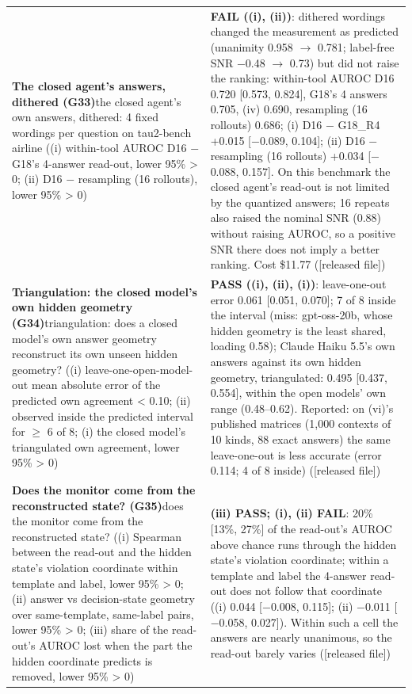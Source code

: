 {\begin{longtable}{p{}p{}}
\textbf{The closed agent's answers, dithered (G33)}\newline the closed agent's own answers, dithered: 4 fixed wordings per question on tau2-bench airline ((i) within-tool AUROC D16 $-$ G18's 4-answer read-out, lower 95\% > 0; (ii) D16 $-$ resampling (16 rollouts), lower 95\% > 0) & \textbf{FAIL ((i), (ii))}: dithered wordings changed the measurement as predicted (unanimity 0.958 $\rightarrow$ 0.781; label-free SNR $-$0.48 $\rightarrow$ 0.73) but did not raise the ranking: within-tool AUROC D16 0.720 [0.573, 0.824], G18's 4 answers 0.705, (iv) 0.690, resampling (16 rollouts) 0.686; (i) D16 $-$ G18\_R4 +0.015 [$-$0.089, 0.104]; (ii) D16 $-$ resampling (16 rollouts) +0.034 [$-$0.088, 0.157]. On this benchmark the closed agent's read-out is not limited by the quantized answers; 16 repeats also raised the nominal SNR (0.88) without raising AUROC, so a positive SNR there does not imply a better ranking. Cost \$11.77 ([released file])\\[2pt]
\textbf{Triangulation: the closed model's own hidden geometry (G34)}\newline triangulation: does a closed model's own answer geometry reconstruct its own unseen hidden geometry? ((i) leave-one-open-model-out mean absolute error of the predicted own agreement < 0.10; (ii) observed inside the predicted interval for $\geq$ 6 of 8; (i) the closed model's triangulated own agreement, lower 95\% > 0) & \textbf{PASS ((i), (ii), (i))}: leave-one-out error 0.061 [0.051, 0.070]; 7 of 8 inside the interval (miss: gpt-oss-20b, whose hidden geometry is the least shared, loading 0.58); Claude Haiku 5.5's own answers against its own hidden geometry, triangulated: 0.495 [0.437, 0.554], within the open models' own range (0.48--0.62). Reported: on (vi)'s published matrices (1,000 contexts of 10 kinds, 88 exact answers) the same leave-one-out is less accurate (error 0.114; 4 of 8 inside) ([released file])\\[2pt]
\textbf{Does the monitor come from the reconstructed state? (G35)}\newline does the monitor come from the reconstructed state? ((i) Spearman between the read-out and the hidden state's violation coordinate within template and label, lower 95\% > 0; (ii) answer vs decision-state geometry over same-template, same-label pairs, lower 95\% > 0; (iii) share of the read-out's AUROC lost when the part the hidden coordinate predicts is removed, lower 95\% > 0) & \textbf{(iii) PASS; (i), (ii) FAIL}: 20\% [13\%, 27\%] of the read-out's AUROC above chance runs through the hidden state's violation coordinate; within a template and label the 4-answer read-out does not follow that coordinate ((i) 0.044 [$-$0.008, 0.115]; (ii) $-$0.011 [$-$0.058, 0.027]). Within such a cell the answers are nearly unanimous, so the read-out barely varies ([released file])\\[2pt]

\end{longtable}}
